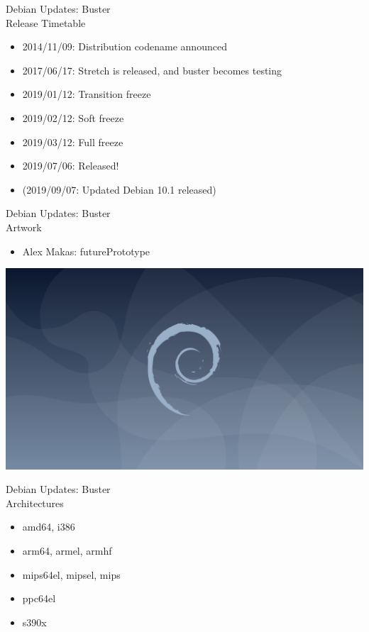 \documentclass[cjk,c,squeeze,shrink,dvipdfmx,12pt]{beamer}
\begin{document}
\begin{frame}[fragile]{%
    Debian Updates: Buster%
    \\[-.5em]{\normalsize{Release Timetable}}
  }
  \pause
  \begin{itemize}[<+->]
  \item 2014/11/09: Distribution codename announced
  \item 2017/06/17: Stretch is released, and buster becomes testing
  \item 2019/01/12: Transition freeze
  \item 2019/02/12: Soft freeze
  \item 2019/03/12: Full freeze
  \item 2019/07/06: Released!
  \item (2019/09/07: Updated Debian 10.1 released)
  \end{itemize}
\end{frame}

\begin{frame}[fragile]{%
    Debian Updates: Buster%
    \\[-.5em]{\normalsize{Artwork}}
  }
  \begin{itemize}
  \item Alex Makas: futurePrototype
  \end{itemize}
  \begin{center}
    \includegraphics[width=0.8\hsize]{image201906/futurePrototype-wallpaper-1920x1080.png}
  \end{center}
\end{frame}

\begin{frame}[fragile]{%
    Debian Updates: Buster%
    \\[-.5em]{\normalsize{Architectures}}
  }
  \begin{itemize}
  \item amd64, i386
  \item arm64, armel, armhf
  \item mips64el, mipsel, mips
  \item ppc64el
  \item s390x
  \end{itemize}
\end{frame}
\end{document}
